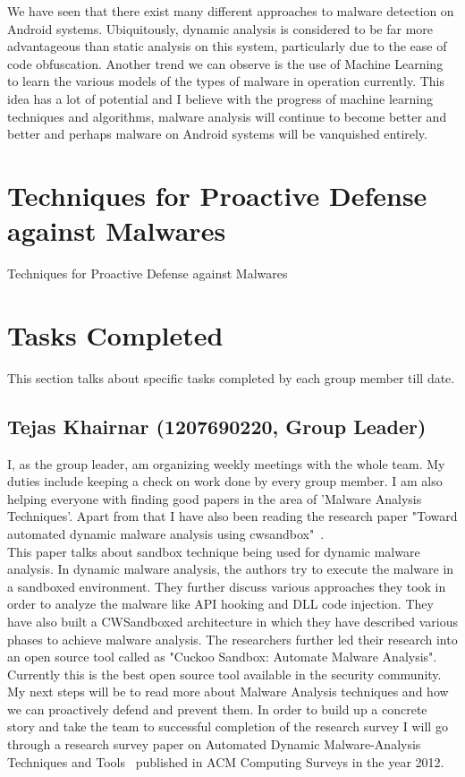 \documentclass[11pt]{article}
\begin{document}
	We have seen that there exist many different approaches to malware detection on Android systems. Ubiquitously, dynamic analysis is considered to be far more advantageous than static analysis on this system, particularly due to the ease of code obfuscation. Another trend we can observe is the use of Machine Learning to learn the various models of the types of malware in operation currently. This idea has a lot of potential and I believe with the progress of machine learning techniques and algorithms, malware analysis will continue to become better and better and perhaps malware on Android systems will be vanquished entirely.

	\section{Techniques for Proactive Defense against Malwares}
	Techniques for Proactive Defense against Malwares
	
	\section{Tasks Completed}
	This section talks about specific tasks completed by each group member till date.
		\subsection{Tejas Khairnar (1207690220, Group Leader)}
		I, as the group leader, am organizing weekly meetings with the whole team. My duties include keeping a check on work done by every group member.
		I am also helping everyone with finding good papers in the area of 'Malware Analysis Techniques'. Apart from that I have also been reading the research paper "Toward automated dynamic malware analysis using cwsandbox"~\cite{willems2007toward}. \\
		This paper talks about sandbox technique being used for dynamic malware analysis. In dynamic malware analysis, the authors try to execute the malware in a sandboxed environment. They further discuss various approaches they took in order to analyze the malware like API hooking and DLL code injection. They have also built a CWSandboxed architecture in which they have described various phases to achieve malware analysis. The researchers further led their research into an open source tool called as "Cuckoo Sandbox: Automate Malware Analysis". Currently this is the best open source tool available in the security community.\\
		My next steps will be to read more about Malware Analysis techniques and how we can proactively defend and prevent them. In order to build up a concrete story and take the team to successful completion of the research survey I will go through a research survey paper on Automated Dynamic Malware-Analysis Techniques and Tools~\cite{egele2012survey} published in ACM Computing Surveys in the year 2012. 		
\end{document}
